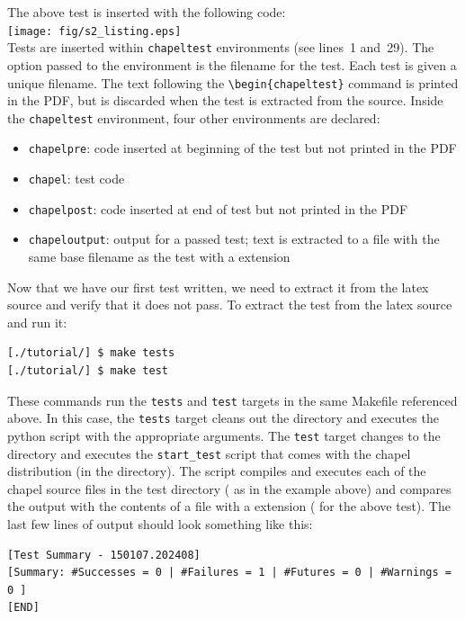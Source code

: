   \begin{seamlessnote}
    The above test is inserted with the following \latex code: \\
    \texttt{[image: fig/s2\_listing.eps]}\\
    Tests are inserted within \verb|chapeltest| environments (see lines~1 and~29). The option
    passed to the environment is the filename for the test. Each test is given a unique filename.
    The text following the \verb|\begin{chapeltest}| command is printed in the PDF, but is 
      discarded when the test is extracted from the \latex source.  Inside the \verb|chapeltest|
      environment, four other environments are declared: 
      \begin{itemize}
        \item \verb|chapelpre|: code inserted at beginning of the test but not printed in the PDF
        \item \verb|chapel|: test code
        \item \verb|chapelpost|: code inserted at end of test but not printed in the PDF
        \item \verb|chapeloutput|:  output for a passed test; text is extracted to a file
          with the same base filename as the test with a  extension
      \end{itemize}

    Now that we have our first test written, we need to extract it from the latex source and verify
    that it does not pass.
    To extract the test from the latex source and run it:
    \begin{verbatim}
[./tutorial/] $ make tests
[./tutorial/] $ make test
    \end{verbatim}
    These commands run the \verb|tests| and \verb|test| targets in the same Makefile referenced above.
    In this case, the \verb|tests| target cleans out the  directory and
    executes the  python script with the appropriate arguments.
    The \verb|test| target changes to the  directory and 
    executes the \verb|start_test| script that comes with
    the chapel distribution (in the  directory). The script compiles 
      and executes each of the
    chapel source files in the test directory 
    (\eg {} as in the example above) 
    and compares the output with the contents of a file with a  extension
    (\eg {} for the above test). 
    The last few lines of output should look something like this:
    \begin{verbatim}
[Test Summary - 150107.202408]
[Summary: #Successes = 0 | #Failures = 1 | #Futures = 0 | #Warnings = 0 ]
[END]
    \end{verbatim}
  \end{seamlessnote}

